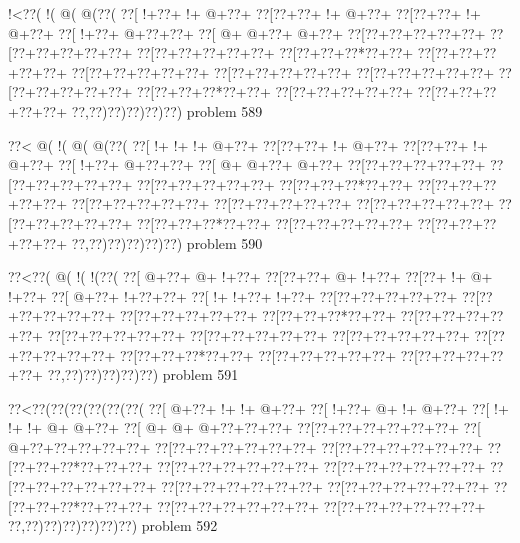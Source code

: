 \vbox{\vbox{\goo
\- !<\0??(\- !(\- @(\- @(\0??(
\0??[\- !+\0??+\- !+\- @+\0??+
\0??[\0??+\0??+\- !+\- @+\0??+
\0??[\0??+\0??+\- !+\- @+\0??+
\0??[\- !+\0??+\- @+\0??+\0??+
\0??[\- @+\- @+\0??+\- @+\0??+
\0??[\0??+\0??+\0??+\0??+\0??+
\0??[\0??+\0??+\0??+\0??+\0??+
\0??[\0??+\0??+\0??+\0??+\0??+
\0??[\0??+\0??+\0??*\0??+\0??+
\0??[\0??+\0??+\0??+\0??+\0??+
\0??[\0??+\0??+\0??+\0??+\0??+
\0??[\0??+\0??+\0??+\0??+\0??+
\0??[\0??+\0??+\0??+\0??+\0??+
\0??[\0??+\0??+\0??+\0??+\0??+
\0??[\0??+\0??+\0??*\0??+\0??+
\0??[\0??+\0??+\0??+\0??+\0??+
\0??[\0??+\0??+\0??+\0??+\0??+
\0??,\0??)\0??)\0??)\0??)\0??)
}
\hfil problem 589\hfil\break
}

\vbox{\vbox{\goo
\0??<\- @(\- !(\- @(\- @(\0??(
\0??[\- !+\- !+\- !+\- @+\0??+
\0??[\0??+\0??+\- !+\- @+\0??+
\0??[\0??+\0??+\- !+\- @+\0??+
\0??[\- !+\0??+\- @+\0??+\0??+
\0??[\- @+\- @+\0??+\- @+\0??+
\0??[\0??+\0??+\0??+\0??+\0??+
\0??[\0??+\0??+\0??+\0??+\0??+
\0??[\0??+\0??+\0??+\0??+\0??+
\0??[\0??+\0??+\0??*\0??+\0??+
\0??[\0??+\0??+\0??+\0??+\0??+
\0??[\0??+\0??+\0??+\0??+\0??+
\0??[\0??+\0??+\0??+\0??+\0??+
\0??[\0??+\0??+\0??+\0??+\0??+
\0??[\0??+\0??+\0??+\0??+\0??+
\0??[\0??+\0??+\0??*\0??+\0??+
\0??[\0??+\0??+\0??+\0??+\0??+
\0??[\0??+\0??+\0??+\0??+\0??+
\0??,\0??)\0??)\0??)\0??)\0??)
}
\hfil problem 590\hfil\break
}

\vbox{\vbox{\goo
\0??<\0??(\- @(\- !(\- !(\0??(
\0??[\- @+\0??+\- @+\- !+\0??+
\0??[\0??+\0??+\- @+\- !+\0??+
\0??[\0??+\- !+\- @+\- !+\0??+
\0??[\- @+\0??+\- !+\0??+\0??+
\0??[\- !+\- !+\0??+\- !+\0??+
\0??[\0??+\0??+\0??+\0??+\0??+
\0??[\0??+\0??+\0??+\0??+\0??+
\0??[\0??+\0??+\0??+\0??+\0??+
\0??[\0??+\0??+\0??*\0??+\0??+
\0??[\0??+\0??+\0??+\0??+\0??+
\0??[\0??+\0??+\0??+\0??+\0??+
\0??[\0??+\0??+\0??+\0??+\0??+
\0??[\0??+\0??+\0??+\0??+\0??+
\0??[\0??+\0??+\0??+\0??+\0??+
\0??[\0??+\0??+\0??*\0??+\0??+
\0??[\0??+\0??+\0??+\0??+\0??+
\0??[\0??+\0??+\0??+\0??+\0??+
\0??,\0??)\0??)\0??)\0??)\0??)
}
\hfil problem 591\hfil\break
}

\vbox{\vbox{\goo
\0??<\0??(\0??(\0??(\0??(\0??(\0??(
\0??[\- @+\0??+\- !+\- !+\- @+\0??+
\0??[\- !+\0??+\- @+\- !+\- @+\0??+
\0??[\- !+\- !+\- !+\- @+\- @+\0??+
\0??[\- @+\- @+\- @+\0??+\0??+\0??+
\0??[\0??+\0??+\0??+\0??+\0??+\0??+
\0??[\- @+\0??+\0??+\0??+\0??+\0??+
\0??[\0??+\0??+\0??+\0??+\0??+\0??+
\0??[\0??+\0??+\0??+\0??+\0??+\0??+
\0??[\0??+\0??+\0??*\0??+\0??+\0??+
\0??[\0??+\0??+\0??+\0??+\0??+\0??+
\0??[\0??+\0??+\0??+\0??+\0??+\0??+
\0??[\0??+\0??+\0??+\0??+\0??+\0??+
\0??[\0??+\0??+\0??+\0??+\0??+\0??+
\0??[\0??+\0??+\0??+\0??+\0??+\0??+
\0??[\0??+\0??+\0??*\0??+\0??+\0??+
\0??[\0??+\0??+\0??+\0??+\0??+\0??+
\0??[\0??+\0??+\0??+\0??+\0??+\0??+
\0??,\0??)\0??)\0??)\0??)\0??)\0??)
}
\hfil problem 592\hfil\break
}

